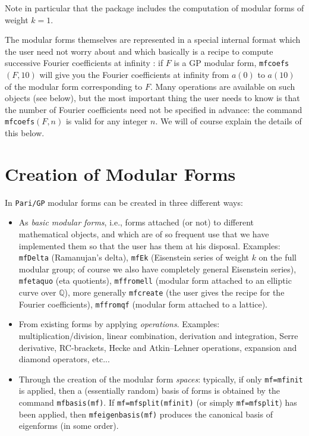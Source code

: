 \documentclass[11pt]{article}
\newcommand{\Q}{{\mathbb Q}}
\def\kbd#1{{\tt #1}}
\begin{document}
Note in particular that the package includes the computation of modular
forms of weight $k=1$.

\medskip

The modular forms themselves are represented in a special internal format
which the user need not worry about and which basically is a recipe to
compute successive Fourier coefficients at infinity : if $F$ is a GP modular
form, \kbd{mfcoefs}$(F, 10)$ will give you the Fourier coefficients at infinity
from $a(0)$ to $a(10)$ of the modular form corresponding to $F$. Many
operations are available on such objects (see below), but the most important
thing the user needs to know is that the number of Fourier coefficients need
not be specified in advance: the command \kbd{mfcoefs}$(F,n)$ is valid for
any integer $n$. We will of course explain the details of this below.

\section{Creation of Modular Forms}

In \kbd{Pari/GP} modular forms can be created in three different ways:

\begin{itemize}\item As \emph{basic modular forms}, i.e., forms attached (or
  not) to different mathematical objects, and which are of so frequent use
  that we have implemented them so that the user has them at his disposal.
  Examples: \kbd{mfDelta} (Ramanujan's delta), \kbd{mfEk}
  (Eisenstein series of weight $k$ on the full modular group; of course
  we also have completely general Eisenstein series), \kbd{mfetaquo}
  (eta quotients), \kbd{mffromell} (modular form attached to an elliptic
  curve over $\Q$), more generally \kbd{mfcreate} (the user gives the
  recipe for the Fourier coefficients), \kbd{mffromqf} (modular form attached
  to a lattice).
\item From existing forms by applying \emph{operations}.
  Examples: multiplication/division, linear combination,
  derivation and integration, Serre derivative, RC-brackets, Hecke and
  Atkin--Lehner operations, expansion and diamond operators, etc...
\item Through the creation of the modular form \emph{spaces}:
  typically, if only \kbd{mf=mfinit} is applied, then a (essentially random)
  basis of forms is obtained by the command \kbd{mfbasis(mf)}. If
  \kbd{mf=mfsplit(mfinit)} (or simply \kbd{mf=mfsplit}) has been applied,
  then \kbd{mfeigenbasis(mf)} produces the canonical basis of eigenforms
  (in some order).\end{itemize}
\end{document}
